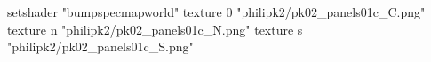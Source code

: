 setshader "bumpspecmapworld"
    texture 0 "philipk2/pk02_panels01c_C.png"
    texture n "philipk2/pk02_panels01c_N.png"
    texture s "philipk2/pk02_panels01c_S.png"